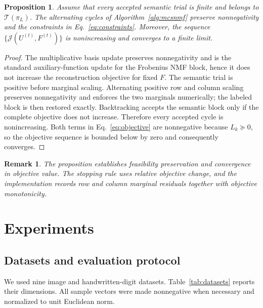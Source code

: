 \documentclass[times, review, 10pt]{elsarticle}
\newtheorem{proposition}{Proposition}
\newtheorem{remark}{Remark}
\begin{document}
\begin{proposition}
Assume that every accepted semantic trial is finite and belongs to $\mathcal T(\pi_L)$. The alternating cycles of Algorithm~\ref{alg:mcsnmf} preserve nonnegativity and the constraints in Eq.~\eqref{eq:constraints}. Moreover, the sequence $\{\mathcal J(U^{(t)},F^{(t)})\}$ is nonincreasing and converges to a finite limit.
\end{proposition}
\begin{proof}
The multiplicative basis update preserves nonnegativity and is the standard auxiliary-function update for the Frobenius NMF block, hence it does not increase the reconstruction objective for fixed $F$. The semantic trial is positive before marginal scaling. Alternating positive row and column scaling preserves nonnegativity and enforces the two marginals numerically; the labeled block is then restored exactly. Backtracking accepts the semantic block only if the complete objective does not increase. Therefore every accepted cycle is nonincreasing. Both terms in Eq.~\eqref{eq:objective} are nonnegative because $L_k\succeq0$, so the objective sequence is bounded below by zero and consequently converges.
\end{proof}

\begin{remark}
The proposition establishes feasibility preservation and convergence in objective value. The stopping rule uses relative objective change, and the implementation records row and column marginal residuals together with objective monotonicity.
\end{remark}

\section{Experiments}

\subsection{Datasets and evaluation protocol}

We used nine image and handwritten-digit datasets. Table~\ref{tab:datasets} reports their dimensions. All sample vectors were made nonnegative when necessary and normalized to unit Euclidean norm.
\end{document}
